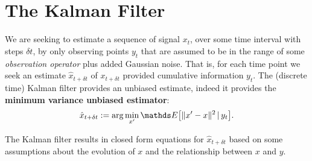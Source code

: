 \section{The Kalman Filter}

We are seeking to estimate a sequence of signal $x_t$, over some
time interval with steps $\delta t$, by only observing points $y_t$ that are assumed
to be in the range of some \emph{observation operator} plus added Gaussian noise.
That is, for each time point we seek an estimate $\hat{x}_{t+\delta t}$ of 
$x_{t+\delta t}$ provided cumulative information $y_t$. The (discrete time)
Kalman filter \cite{kalman1960new} provides an unbiased estimate, indeed it provides the
\textbf{minimum variance unbiased estimator}:
\[
\hat{x}_{t+\delta t} := \arg\min_{x'} \expect{\|x' - x\|^2 \given y_t}.
\]

The Kalman filter results in closed form equations for $\hat{x}_{t+\delta t}$ based
on some assumptions about the evolution of $x$ and the relationship between
$x$ and $y$.

\iffalse
\begin{itemize}
    \item Singular evolutive extended Kalman filter (SEEK)
approximates the error covariance matrix by a singular low rank matrix, and makes correction only in those directions associated with the singular basis
    \item adding control to \eqref{eq:state_and_observation_equations}?
    \item filter inbreeding (P. Houtekamer and H. Mitchell. Data assimilation using an ensemble Kalman filter technique)
    \item Local ensemble transform Kalman filter
    \item 3D and 4D VaR
    \item Extensions \& Nonlinear Filtering
\end{itemize}

In this section, we describe the Kalman filter \cite{kalman1960new}, a predictive 
linear Gaussian filter whose the objective is generate a sequence of estimates of
a Gaussian random variable given a sequence of measurements. 
i.e. the posterior $\rho(X|Y)$ of a system i.e. the 
probability of $X\in\mathcal{X}$ given $y\in\mathcal{Y}$, via Bayes' rule:
\begin{equation}\label{bayesrule}
\rho(X|Y) \propto \rho(X)\rho(Y|X),
\end{equation}
for some prior information $\rho(X)\sim \mathcal{N}(\mu, C)$ about a state $X$ and likelihood $\rho(Y|X)$ of a prediction $Y|X\in\mathcal{Y}$.
\fi

